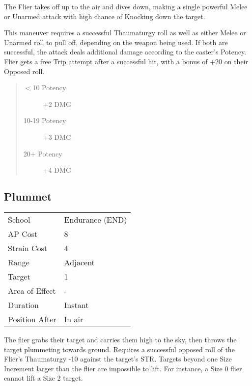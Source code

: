 \documentclass[11pt,a4paper,twocolumn]{book}
\begin{document}
\medskip

The Flier takes off up to the air and dives down, making a single powerful Melee or Unarmed attack with high chance of Knocking down the target.

This maneuver requires a successful Thaumaturgy roll as well as either Melee or Unarmed roll to pull off, depending on the weapon being used. If both are successful, the attack deals additional damage according to the caster's Potency. Flier gets a free Trip attempt after a successful hit, with a bonus of +20 on their Opposed roll.

\begin{quote}
	\begin{description}
		\item[$<$10 Potency] 	+2 DMG
		\item[10-19 Potency] 	+3 DMG
		\item[20+ Potency] 	+4 DMG
	\end{description}
\end{quote}



\subsection*{Plummet}

{
	\begin{tabu} to 75mm{| X[l,4] | X[l,7] |}
		\hline
		School 			& Endurance (END) 	\\
		AP Cost	      	& 8					\\
		Strain Cost     & 4 				\\
		Range     		& Adjacent 				\\
		Target      	& 1 				\\
		Area of Effect  & - 	 			\\
		Duration     	& Instant 	 		\\
		Position After  & In air 			\\ \hline
	\end{tabu}
}

\medskip

The flier grabs their target and carries them high to the sky, then throws the target plummeting towards ground. Requires a successful opposed roll of the Flier's Thaumaturgy -10 against the target's STR. Targets beyond one Size Increment larger than the flier are impossible to lift. For instance, a Size 0 flier cannot lift a Size 2 target.
\end{document}
